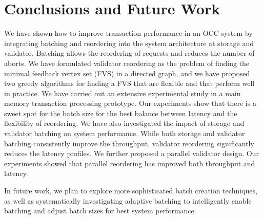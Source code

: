 \section{Conclusions and Future Work}\label{sec:conclusion}
We have shown how to improve transaction performance in an OCC system by integrating batching and reordering into the system architecture at storage and validator. Batching allows the reordering of requests and reduces the number of aborts. We have formulated validator reordering as the problem of finding the minimal feedback vertex set (FVS) in a directed graph, and we have proposed two greedy algorithms for finding a FVS that are flexible and that perform well in practice. We have carried out an extensive experimental study in a main memory transaction processing prototype. Our experiments show that there is a sweet spot for the batch size for the best balance between latency and the flexibility of reordering. We have also investigated the impact of storage and validator batching on system performance. While both storage and validator batching consistently improve the throughput, validator reordering significantly reduces the latency profiles. We further proposed a parallel validator design. Our experiments showed that parallel reordering has improved both throughput and latency.

In future work, we plan to explore more sophisticated batch creation techniques, as well as systematically investigating adaptive batching to intelligently enable batching and adjust batch sizes for best system performance.


